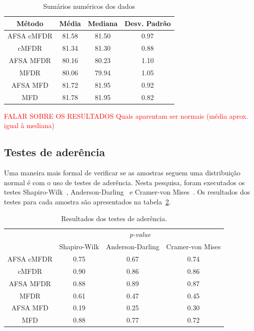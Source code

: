 \documentclass[conference]{IEEEtran}
\begin{document}
\begin{table}[h]
	\centering
	\caption{Sumários numéricos dos dados}
	\label{tab:est_descr}
	\begin{tabular}{c|ccc}
		Método    	& Média  	& Mediana 	& Desv. Padrão  \\
		\hline
		AFSA cMFDR 	& 81.58 	& 81.50 	& 0.97 \\
		cMFDR 		& 81.34 	& 81.30		& 0.88 \\
		AFSA MFDR 	& 80.16 	& 80.23 	& 1.10 \\
		MFDR 		& 80.06 	& 79.94 	& 1.05 \\
		AFSA MFD 	& 81.72 	& 81.95 	& 0.92 \\
		MFD 		& 81.78 	& 81.95 	& 0.82 \\
		\hline
	\end{tabular}
\end{table}

\textcolor{red}{FALAR SOBRE OS RESULTADOS
Quais aparentam ser normais (média aprox. igual à mediana)
}


\subsection{Testes de aderência}

Uma maneira mais formal de verificar se as amostras seguem uma distribuição normal é com o uso de testes de aderência.
Nesta pesquisa, foram executados os testes Shapiro-Wilk~\cite{shapiro1965analysis}, Anderson-Darling~\cite{anderson1954test} e Cramer-von Mises~\cite{durbin1972components}.
Os resultados dos testes para cada amostra são apresentados na tabela~\ref{tab:aderencia}.

\begin{table}[h]
	\centering
	\caption{Resultados dos testes de aderência.}
	\label{tab:aderencia}
	\begin{tabular}{c|ccc}
		\hline
		& \multicolumn{3}{c}{\textit{p-value}}      \\
		\cline{2-4}
						& Shapiro-Wilk 	& Anderson-Darling  & Cramer-von Mises\\
		\hline
		AFSA cMFDR		& 0.75       	& 0.67           	& 0.74 \\
		cMFDR 			& 0.90       	& 0.86          	& 0.86 \\
		AFSA MFDR  		& 0.88       	& 0.89          	& 0.87 \\
		MFDR  			& 0.61       	& 0.47            	& 0.45 \\
		AFSA MFD   		& 0.19       	& 0.25          	& 0.30 \\
		MFD   			& 0.88       	& 0.77          	& 0.72 \\
		\hline
	\end{tabular}
\end{table}
\end{document}
